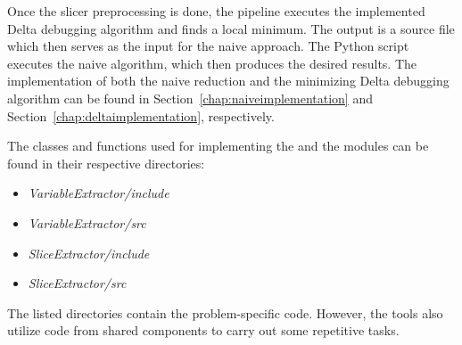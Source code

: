Once the slicer preprocessing is done, the pipeline executes the implemented 
Delta debugging algorithm and finds a local minimum. 
The output is a source file which then serves as the input for the naive 
approach.
The Python script executes the naive algorithm, which then produces the 
desired results.
The implementation of both the naive reduction and the minimizing Delta 
debugging algorithm can be found in Section~\ref{chap:naiveimplementation} 
and Section~\ref{chap:deltaimplementation}, respectively.

The classes and functions used for implementing 
the  and the  modules can be 
found in their respective directories:
\begin{itemize}
  \item \emph{VariableExtractor/include}
  \item \emph{VariableExtractor/src}
  \item \emph{SliceExtractor/include}
  \item \emph{SliceExtractor/src}
\end{itemize}
The listed directories contain the problem-specific code. 
However, the tools also utilize code from shared components to carry out 
some repetitive tasks.